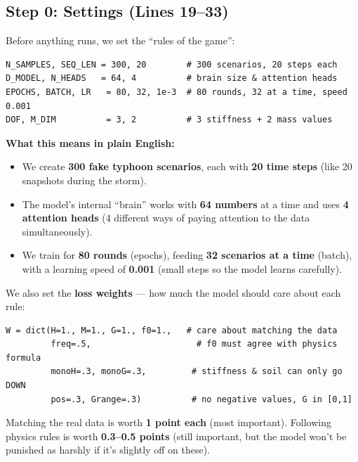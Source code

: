 \documentclass[11pt,a4paper]{article}
\begin{document}
\subsection{Step 0: Settings (Lines 19--33)}

Before anything runs, we set the ``rules of the game'':

\begin{lstlisting}
N_SAMPLES, SEQ_LEN = 300, 20        # 300 scenarios, 20 steps each
D_MODEL, N_HEADS   = 64, 4          # brain size & attention heads
EPOCHS, BATCH, LR   = 80, 32, 1e-3  # 80 rounds, 32 at a time, speed 0.001
DOF, M_DIM          = 3, 2          # 3 stiffness + 2 mass values
\end{lstlisting}

\textbf{What this means in plain English:}
\begin{itemize}[nosep]
  \item We create \textbf{300 fake typhoon scenarios}, each with
        \textbf{20 time steps} (like 20 snapshots during the storm).
  \item The model's internal ``brain'' works with \textbf{64 numbers}
        at a time and uses \textbf{4 attention heads} (4 different ways
        of paying attention to the data simultaneously).
  \item We train for \textbf{80 rounds} (epochs), feeding
        \textbf{32 scenarios at a time} (batch), with a learning speed
        of \textbf{0.001} (small steps so the model learns carefully).
\end{itemize}

We also set the \textbf{loss weights} --- how much the model should
care about each rule:

\begin{lstlisting}
W = dict(H=1., M=1., G=1., f0=1.,   # care about matching the data
         freq=.5,                     # f0 must agree with physics formula
         monoH=.3, monoG=.3,         # stiffness & soil can only go DOWN
         pos=.3, Grange=.3)          # no negative values, G in [0,1]
\end{lstlisting}

\begin{analogybox}
Matching the real data is worth \textbf{1 point each} (most important).
Following physics rules is worth \textbf{0.3--0.5 points} (still
important, but the model won't be punished as harshly if it's slightly
off on these).
\end{analogybox}
\end{document}

